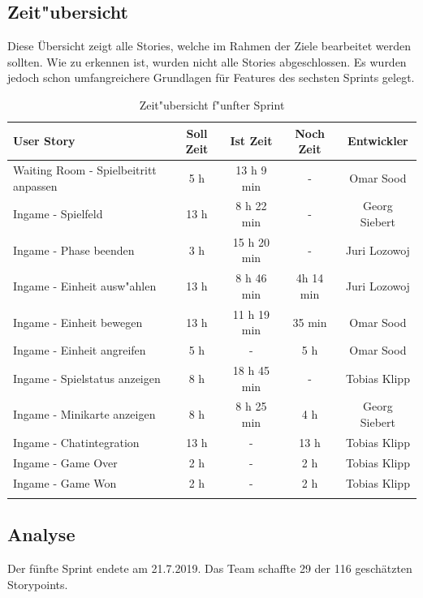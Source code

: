 \documentclass[12pt, titlepage]{scrartcl}
\begin{document}
        \subsection{Zeit"ubersicht}
        	Diese \"Ubersicht zeigt alle Stories, welche im Rahmen der Ziele bearbeitet werden sollten. Wie zu erkennen ist, wurden nicht alle Stories abgeschlossen. Es wurden jedoch schon umfangreichere Grundlagen f\"ur Features des sechsten Sprints gelegt.
        	\begin{longtable}[H]{p{6cm} c c c c }
        			\label{Time_1}
       				\textbf{User Story} & \textbf{Soll Zeit} & \textbf{Ist Zeit} & \textbf{Noch Zeit} & \textbf{Entwickler} \\
       				\toprule
       				\endhead
       				Waiting Room - Spielbeitritt anpassen & 5 h & 13 h 9 min & - & Omar Sood\\
       				Ingame - Spielfeld & 13 h & 8 h 22 min & - & Georg Siebert\\
       				Ingame - Phase beenden & 3 h & 15 h 20 min & - & Juri Lozowoj \\
       				Ingame - Einheit ausw"ahlen & 13 h & 8 h 46 min & 4h 14 min & Juri Lozowoj \\
       				Ingame - Einheit bewegen & 13 h & 11 h 19 min & 35 min & Omar Sood \\
       				Ingame - Einheit angreifen & 5 h & - & 5 h & Omar Sood \\
       				Ingame - Spielstatus anzeigen & 8 h & 18 h 45 min & - & Tobias Klipp \\
       				Ingame - Minikarte anzeigen & 8 h & 8 h 25 min & 4 h & Georg Siebert \\
       				Ingame - Chatintegration & 13 h & - & 13 h & Tobias Klipp \\
       				Ingame - Game Over & 2 h & - & 2 h & Tobias Klipp \\
       				Ingame - Game Won & 2 h & - & 2 h & Tobias Klipp \\
        			\caption{Zeit"ubersicht f"unfter Sprint}
        	\end{longtable}
        \subsection{Analyse}
        	Der f\"unfte Sprint endete am 21.7.2019. Das Team schaffte 29 der 116 gesch\"atzten Storypoints.
\end{document}
